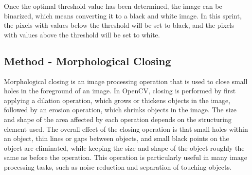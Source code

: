 Once the optimal threshold value has been determined, the image can be binarized, which means converting it to a black and white image. In this sprint, the pixels with values below the threshold will be set to black, and the pixels with values above the threshold will be set to white.

\subsection*{Method - Morphological Closing}

Morphological closing is an image processing operation that is used to close small holes in the foreground of an image. In OpenCV, closing is performed by first applying a dilation operation, which grows or thickens objects in the image, followed by an erosion operation, which shrinks objects in the image. The size and shape of the area affected by each operation depends on the structuring element used. The overall effect of the closing operation is that small holes within an object, thin lines or gaps between objects, and small black points on the object are eliminated, while keeping the size and shape of the object roughly the same as before the operation. This operation is particularly useful in many image processing tasks, such as noise reduction and separation of touching objects. \cite{haralickImageAnalysisUsing1987}

